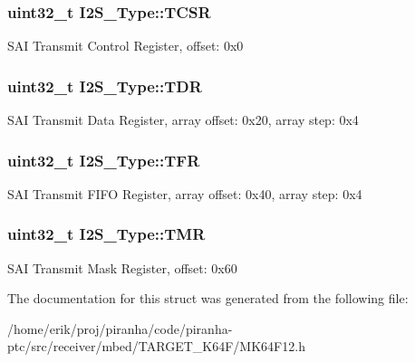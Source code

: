 \subsubsection[{\texorpdfstring{T\+C\+SR}{TCSR}}]{ uint32\+\_\+t I2\+S\+\_\+\+Type\+::\+T\+C\+SR}\hypertarget{structI2S__Type_ac267d105f56a5a51a2f96ca821c3e4a7}{}\label{structI2S__Type_ac267d105f56a5a51a2f96ca821c3e4a7}
S\+AI Transmit Control Register, offset\+: 0x0 
\subsubsection[{\texorpdfstring{T\+DR}{TDR}}]{ uint32\+\_\+t I2\+S\+\_\+\+Type\+::\+T\+DR}\hypertarget{structI2S__Type_aa64a72681c17030d8003eff7fa2b1bd4}{}\label{structI2S__Type_aa64a72681c17030d8003eff7fa2b1bd4}
S\+AI Transmit Data Register, array offset\+: 0x20, array step\+: 0x4 
\subsubsection[{\texorpdfstring{T\+FR}{TFR}}]{ uint32\+\_\+t I2\+S\+\_\+\+Type\+::\+T\+FR}\hypertarget{structI2S__Type_a67ac28f403b29131e232d0071b92a1ac}{}\label{structI2S__Type_a67ac28f403b29131e232d0071b92a1ac}
S\+AI Transmit F\+I\+FO Register, array offset\+: 0x40, array step\+: 0x4 
\subsubsection[{\texorpdfstring{T\+MR}{TMR}}]{ uint32\+\_\+t I2\+S\+\_\+\+Type\+::\+T\+MR}\hypertarget{structI2S__Type_a2ddc0ba302f2eeb23c02a94fabab1af1}{}\label{structI2S__Type_a2ddc0ba302f2eeb23c02a94fabab1af1}
S\+AI Transmit Mask Register, offset\+: 0x60 

The documentation for this struct was generated from the following file\+:\begin{DoxyCompactItemize}
\item 
/home/erik/proj/piranha/code/piranha-\/ptc/src/receiver/mbed/\+T\+A\+R\+G\+E\+T\+\_\+\+K64\+F/M\+K64\+F12.\+h\end{DoxyCompactItemize}

